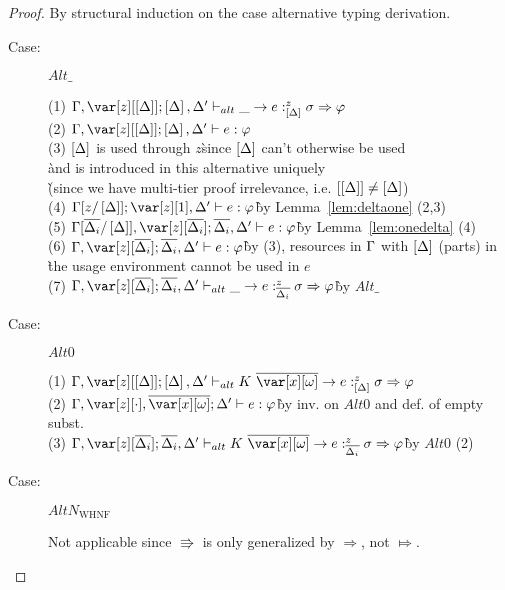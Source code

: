 
\irrelevancelemma*

\begin{proof}
By structural induction on the case alternative typing derivation.

\begin{description}

\item[Case:] $Alt\_$
\begin{tabbing}
    (1) $\G,\z[\irr{\D}];\irr{\D}, \D' \vdash_{alt} \_ \to e :^z_{\irr{\D}} \s \Rightarrow \vp$\\
    (2) $\G, \z[\irr{\D}];\irr{\D},\D' \vdash e : \vp$\\
    (3) $\left[\Delta\right]$ is used through $z$\`since $\left[\Delta\right]$ can't otherwise be used\\\`and is introduced in this alternative uniquely \\\`(since we have multi-tier proof irrelevance, i.e. $\left[\left[\Delta\right]\right]\neq\left[\Delta\right]$)\\
    (4) $\G[z/\irr{\D}]; \z[1], \D' \vdash e : \vp$\` by Lemma~\ref{lem:deltaone} (2,3)\\
    (5) $\G[\ov{\D_i}/\irr{\D}], \z[\ov{\D_i}]; \ov{\D_i}, \D' \vdash e : \vp$\` by Lemma~\ref{lem:onedelta} (4)\\
    (6) $\G, \z[\ov{\D_i}]; \ov{\D_i}, \D' \vdash e : \vp$\` by (3), resources in $\Gamma$ with $\left[\Delta\right]$ (parts) in\\\` the usage environment cannot be used in $e$\\
    (7) $\G, \z[\ov{\D_i}]; \ov{\D_i}, \D' \vdash_{alt} \_ \to e :^z_{\ov{\D_i}} \s \Rightarrow \vp$\` by $Alt\_$\\
\end{tabbing}

\item[Case:] $Alt0$
\begin{tabbing}
    (1) $\G, \z[\irr{\D}]; \irr{\D}, \D' \vdash_{alt} K~\ov{\xo}\to e :^z_{\irr{\D}} \s \Rightarrow \vp$\\
    (2) $\G, \z[\cdot], \ov{\xo}; \D' \vdash e : \vp$\` by inv. on $Alt0$ and def. of empty subst.\\
    (3) $\G, \z[\ov{\D_i}]; \ov{\D_i}, \D' \vdash_{alt} K~\ov{\xo}\to e :^z_{\ov{\D_i}} \s \Rightarrow \vp$\` by $Alt0$ (2)\\
\end{tabbing}

\item[Case:] $AltN_{\textrm{WHNF}}$
\begin{tabbing}
    Not applicable since $\Rrightarrow$ is only generalized by $\Rightarrow$, not $\Mapsto$.
\end{tabbing}


\end{description}
\end{proof}
